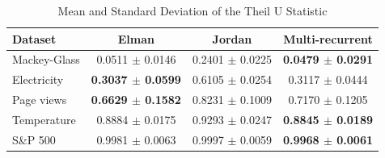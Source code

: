 \begin{table}[t]
\centering
\caption{Mean and Standard Deviation of the Theil U Statistic}
\label{tab:theil}
\footnotesize
\begin{tabular}{@{}lccc@{}}
\toprule
Dataset & Elman & Jordan & Multi-recurrent \\
\midrule
Mackey-Glass & 0.0511 $\pm$ 0.0146 & 0.2401 $\pm$ 0.0225 & \textbf{0.0479 $\pm$ 0.0291} \\
Electricity & \textbf{0.3037 $\pm$ 0.0599} & 0.6105 $\pm$ 0.0254 & 0.3117 $\pm$ 0.0444 \\
Page views & \textbf{0.6629 $\pm$ 0.1582} & 0.8231 $\pm$ 0.1009 & 0.7170 $\pm$ 0.1205 \\
Temperature & 0.8884 $\pm$ 0.0175 & 0.9293 $\pm$ 0.0247 & \textbf{0.8845 $\pm$ 0.0189} \\
S\&P 500 & 0.9981 $\pm$ 0.0063 & 0.9997 $\pm$ 0.0059 & \textbf{0.9968 $\pm$ 0.0061} \\
\bottomrule
\end{tabular}
\end{table}
